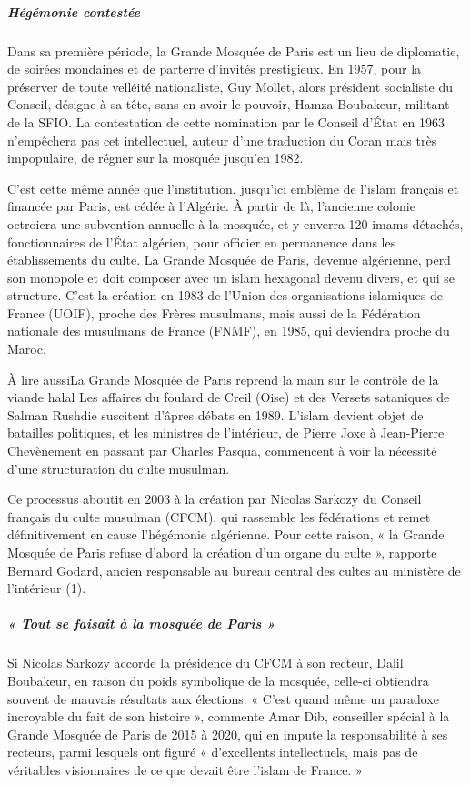 \subparagraph{Hégémonie contestée}

Dans sa première période, la Grande Mosquée de Paris est un lieu de diplomatie, de soirées mondaines et de parterre d’invités prestigieux. En 1957, pour la préserver de toute velléité nationaliste, Guy Mollet, alors président socialiste du Conseil, désigne à sa tête, sans en avoir le pouvoir, Hamza Boubakeur, militant de la SFIO. La contestation de cette nomination par le Conseil d’État en 1963 n’empêchera pas cet intellectuel, auteur d’une traduction du Coran mais très impopulaire, de régner sur la mosquée jusqu’en 1982.

C’est cette même année que l’institution, jusqu’ici emblème de l’islam français et financée par Paris, est cédée à l’Algérie. À partir de là, l’ancienne colonie octroiera une subvention annuelle à la mosquée, et y enverra 120 imams détachés, fonctionnaires de l’État algérien, pour officier en permanence dans les établissements du culte. La Grande Mosquée de Paris, devenue algérienne, perd son monopole et doit composer avec un islam hexagonal devenu divers, et qui se structure. C’est la création en 1983 de l’Union des organisations islamiques de France (UOIF), proche des Frères musulmans, mais aussi de la Fédération nationale des musulmans de France (FNMF), en 1985, qui deviendra proche du Maroc.

À lire aussiLa Grande Mosquée de Paris reprend la main sur le contrôle de la viande halal
Les affaires du foulard de Creil (Oise) et des Versets sataniques de Salman Rushdie suscitent d’âpres débats en 1989. L’islam devient objet de batailles politiques, et les ministres de l’intérieur, de Pierre Joxe à Jean-Pierre Chevènement en passant par Charles Pasqua, commencent à voir la nécessité d’une structuration du culte musulman.

Ce processus aboutit en 2003 à la création par Nicolas Sarkozy du Conseil français du culte musulman (CFCM), qui rassemble les fédérations et remet définitivement en cause l’hégémonie algérienne. Pour cette raison, « la Grande Mosquée de Paris refuse d’abord la création d’un organe du culte », rapporte Bernard Godard, ancien responsable au bureau central des cultes au ministère de l’intérieur (1).
\subparagraph{« Tout se faisait à la mosquée de Paris »}

Si Nicolas Sarkozy accorde la présidence du CFCM à son recteur, Dalil Boubakeur, en raison du poids symbolique de la mosquée, celle-ci obtiendra souvent de mauvais résultats aux élections. « C’est quand même un paradoxe incroyable du fait de son histoire », commente Amar Dib, conseiller spécial à la Grande Mosquée de Paris de 2015 à 2020, qui en impute la responsabilité à ses recteurs, parmi lesquels ont figuré « d’excellents intellectuels, mais pas de véritables visionnaires de ce que devait être l’islam de France. »

